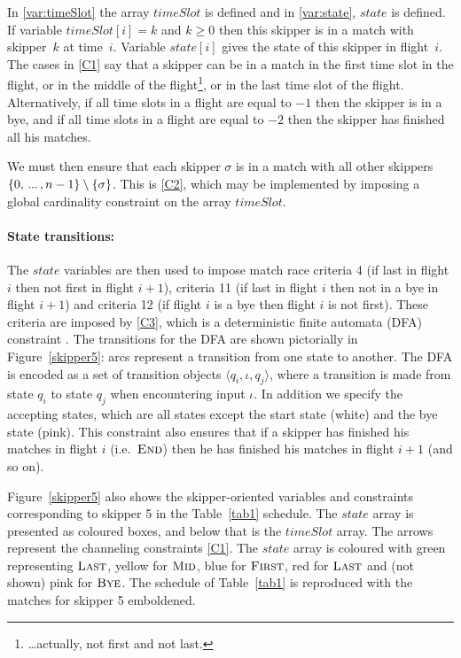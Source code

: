 \documentclass{llncs}
\newcommand{\timeSlot}{\mathit{timeSlot}}
\newcommand{\state}{\mathit{state}}
\newcommand{\FIRST}{\textnormal{\textsc{First}}}
\newcommand{\MID}{\textnormal{\textsc{Mid}}}
\newcommand{\LAST}{\textnormal{\textsc{Last}}}
\newcommand{\END}{\textnormal{\textsc{End}}}
\newcommand{\BYE}{\textnormal{\textsc{Bye}}}
\newcommand\nldots{\,\hbox to 0.8em{.\hss.\hss.}\,}
\begin{document}
In \eqref{var:timeSlot} the array $\timeSlot$ is defined and in
\eqref{var:state}, $\state$ is defined. If variable $\timeSlot[{i}] = k$ and $k
\geq 0$ then this skipper is in a match with skipper~$k$ at time~$i$. Variable
$\state[{i}]$ gives the state of this skipper in flight~$i$. The cases in
\eqref{C1} say that a skipper can be in a match in the first time slot in the
flight, or in the middle of the flight\footnote{\ldots actually, not first and
not last.}, or in the last time slot of the flight. Alternatively, if all time
slots in a flight are equal to $-1$ then the skipper is in a bye, and if all time
slots in a flight are equal to $-2$ then the skipper has finished all his
matches.

We must then ensure that each skipper $\sigma$ is in a match with all other
skippers $\{0, \nldots, n-1\} \setminus \{\sigma\}$. This is \eqref{C2}, which
may be implemented by imposing a global cardinality constraint \cite{globCard}
on the array $\timeSlot$.

\paragraph{State transitions:} The $\state$ variables are then used to impose
match race criteria 4 (if last in flight $i$ then not first in flight $i+1$),
criteria 11 (if last in flight $i$ then not in a bye in flight $i+1$) and
criteria 12 (if flight $i$ is a bye then flight $i$ is not first).  These
criteria are imposed by \eqref{C3}, which is a deterministic finite automata
(DFA) constraint \cite{Pesant04}. The transitions for the DFA are shown
pictorially in Figure~\ref{skipper5}: arcs represent a transition from one
state to another. The DFA is encoded as a set of transition objects $\langle
q_{i},\iota,q_{j} \rangle$, where a transition is made from state $q_{i}$ to
state $q_{j}$ when encountering input $\iota$. In addition we specify the
accepting states, which are all states except the start state (white) and the
bye state (pink).  This constraint also ensures that if a skipper has finished
his matches in flight $i$ (i.e.\ $\END$) then he has finished his matches in
flight $i+1$ (and so on).

Figure~\ref{skipper5} also shows the skipper-oriented variables and constraints
corresponding to skipper 5 in the Table~\ref{tab1} schedule. The $\state$ array
is presented as coloured boxes, and below that is the $\timeSlot$ array. The
arrows represent the channeling constraints \eqref{C1}. The
$\state$ array is coloured with green representing $\LAST$, yellow for $\MID$, blue
for $\FIRST$, red for $\LAST$ and (not shown) pink for $\BYE$. The schedule of
Table~\ref{tab1} is reproduced with the matches for skipper 5 emboldened.
\end{document}
